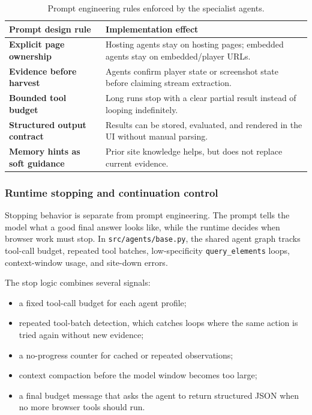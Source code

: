 \begin{table}[!htbp]
\centering
\begin{tabularx}{\textwidth}{>{\raggedright\arraybackslash\bfseries}p{3.3cm}
                              >{\raggedright\arraybackslash}X}
\toprule
\rowcolor{accent!8}
Prompt design rule & Implementation effect \\
\midrule
Explicit page ownership & Hosting agents stay on hosting pages; embedded agents
stay on embedded/player URLs. \\
Evidence before harvest & Agents confirm player state or screenshot state before
claiming stream extraction. \\
Bounded tool budget & Long runs stop with a clear partial result instead of
looping indefinitely. \\
Structured output contract & Results can be stored, evaluated, and rendered in
the UI without manual parsing. \\
Memory hints as soft guidance & Prior site knowledge helps, but does not replace
current evidence. \\
\bottomrule
\end{tabularx}
\caption{Prompt engineering rules enforced by the specialist agents.}\label{tab:prompt-engineering-rules}
\end{table}

\subsubsection{Runtime stopping and continuation control}

Stopping behavior is separate from prompt engineering. The prompt tells the model what a
good final answer looks like, while the runtime decides when browser work must stop. In
\texttt{src/agents/base.py}, the shared agent graph tracks tool-call budget, repeated
tool batches, low-specificity \texttt{query\_elements} loops, context-window usage, and
site-down errors.

The stop logic combines several signals:
\begin{itemize}
  \item a fixed tool-call budget for each agent profile;
  \item repeated tool-batch detection, which catches loops where the same action is tried
  again without new evidence;
  \item a no-progress counter for cached or repeated observations;
  \item context compaction before the model window becomes too large;
  \item a final budget message that asks the agent to return structured JSON when no more
  browser tools should run.
\end{itemize}

